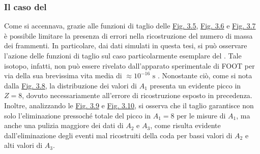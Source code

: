 \documentclass[12pt,a4paper,twoside]{report}
\begin{document}
	\subsubsection{Il caso del }
	Come si accennava, grazie alle funzioni di taglio delle \hyperref[fig:a1_cut]{Fig. 3.5}, \hyperref[fig:a2_cut]{Fig. 3.6} e \hyperref[fig:a3_cut]{Fig. 3.7} è possibile limitare la presenza di errori nella ricostruzione del numero di massa dei frammenti. In particolare, dai dati simulati in questa tesi, si può osservare l'azione delle funzioni di taglio sul caso particolarmente esemplare del . Tale isotopo, infatti, non può essere rivelato dall'apparato sperimentale di FOOT per via della sua brevissima vita media di $\approx10^{-16}\mbox{ s}$ \cite{TILLEY2004155}. Nonostante ciò, come si nota dalla \hyperref[fig:berillium1]{Fig. 3.8}, la distribuzione dei valori di $A_1$ presenta un evidente picco in $Z=8$, dovuto necessariamente all'errore di ricostruzione esposto in precedenza. Inoltre, analizzando le \hyperref[fig:berillium2]{Fig. 3.9} e \hyperref[fig:berillium3]{Fig. 3.10}, si osserva che il taglio garantisce non solo l'eliminazione pressoché totale del picco in $A_1=8$ per le misure di $A_1$, ma anche una pulizia maggiore dei dati di $A_2$ e $A_3$, come risulta evidente dall'eliminazione degli eventi mal ricostruiti della coda per bassi valori di $A_2$ e alti valori di $A_3$.
	
\end{document}
